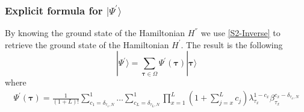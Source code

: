 \documentclass[10pt]{article}
\numberwithin{equation}{section}
\numberwithin{equation}{subsection}
\newcommand{\dt}{\;.}
\newcommand{\com}[1]{{ (* {\color{red}\small #1}*)}}
\begin{document}
\subsubsection{Explicit formula for $|\Psi^{'}\rangle$}\label{subsectionSSdual}
By knowing the ground state  of the Hamiltonian $H^{''}$ we use \eqref{S2-Inverse} to retrieve the ground state of the Hamiltonian $H^{'}$. The result is the following 
\begin{equation}\label{ABS-vect}
    |\Psi^{'}\rangle =\sum_{\bm{\tau}\in \Omega}\Psi^{'}(\bm{\tau})|\bm{\tau}\rangle 
\end{equation}
where  
\begin{equation}\label{ABS}
		\begin{split}
			\Psi^{'}(\bm{\tau})=\frac{1}{(1+L)!}\sum_{c_{1}=\delta_{\tau_{1},N}}^{1}\ldots\sum_{c_{L}=\delta_{\tau_{L},N}}^{1}\prod_{x=1}^{L}\left(1+\sum_{j=x}^{L}c_{j}\right)\lambda_{\tau_{x}}^{1-c_{x}}\beta_{\tau_{x}}^{c_{x}-\delta_{\tau_{x},N}}
		\end{split}
	\end{equation} 
\begin{comment}
{\color{blue}
	\begin{equation}
		\Psi^{'}(\bm{\tau})=\frac{1}{(1+L)!}\sum_{c_{1}=0}^{1-\delta_{\tau_{1},N}}\ldots\sum_{c_{L}=0}^{1-\delta_{\tau_{L},N}}\prod_{x=1}^{L}\lambda_{\tau_{x}}^{c_{x}}\left(2+L-x-\sum_{j=x}^{L}c_{j}\right)\beta_{\tau_{x}}^{(1-c_{x}-\delta_{\tau_{x},N})}
	\end{equation}
\begin{equation}
	\Psi^{'}(\bm{\tau})=\sum_{c_{1}=0}^{1-\delta_{\tau_{1},N}}\ldots\sum_{c_{L}=0}^{1-\delta_{\tau_{L},N}}\frac{\Gamma(2+L-\sum_{z=1}^{L}c_{z})}{\Gamma(L+2)}\prod_{x=1}^{L}\left(\lambda_{\tau_{x}}\left(2+L-x-\sum_{j=x}^{L}c_{j}\right)\right)^{c_{x}}\beta_{\tau_{x}}^{(1-c_{x})(1-\delta_{\tau_{x},N})}\dt
\end{equation}
	\begin{equation}
		\Psi^{'}(\bm{\tau})=\frac{1}{(1+L)!}\sum_{c_{1}=0}^{1-\delta_{\tau_{1},N}}\ldots\sum_{c_{L}=0}^{1-\delta_{\tau_{L},N}}\prod_{x=1}^{L}\left(\frac{\lambda_{\tau_{x}}}{\beta_{\tau_x}}\right)^{c_{x}}\left(2+L-x-\sum_{j=x}^{L}c_{j}\right)\beta_{\tau_{x}}^{1-\delta_{\tau_{x},N} }
	\end{equation}
}
\end{comment}
\end{document}
